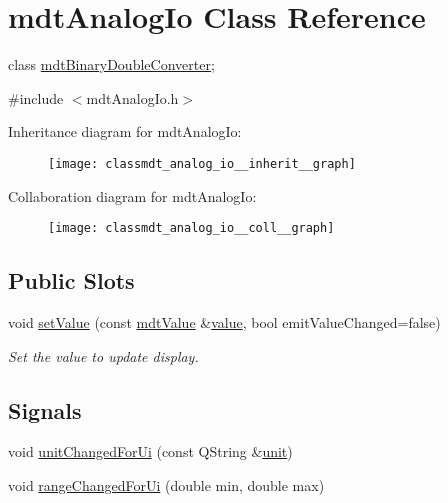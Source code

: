 \hypertarget{classmdt_analog_io}{\section{mdt\-Analog\-Io Class Reference}
\label{classmdt_analog_io}
}


class \hyperlink{classmdt_binary_double_converter}{mdt\-Binary\-Double\-Converter};  




{\ttfamily \#include $<$mdt\-Analog\-Io.\-h$>$}



Inheritance diagram for mdt\-Analog\-Io\-:\nopagebreak
\begin{figure}[H]
\begin{center}
\leavevmode
\texttt{[image: classmdt\_analog\_io\_\_inherit\_\_graph]}
\end{center}
\end{figure}


Collaboration diagram for mdt\-Analog\-Io\-:\nopagebreak
\begin{figure}[H]
\begin{center}
\leavevmode
\texttt{[image: classmdt\_analog\_io\_\_coll\_\_graph]}
\end{center}
\end{figure}
\subsection*{Public Slots}
\begin{DoxyCompactItemize}
\item 
void \hyperlink{classmdt_analog_io_aa2c2fb87d67aad7bbba1b488cc8c1df2}{set\-Value} (const \hyperlink{classmdt_value}{mdt\-Value} \&\hyperlink{classmdt_abstract_io_a839b0d3a4a1d4616e5b20d744c5f75a1}{value}, bool emit\-Value\-Changed=false)
\begin{DoxyCompactList}\small\item\em Set the value to update display. \end{DoxyCompactList}\end{DoxyCompactItemize}
\subsection*{Signals}
\begin{DoxyCompactItemize}
\item 
void \hyperlink{classmdt_analog_io_aa81b49605f601850ecfa780f2b758e98}{unit\-Changed\-For\-Ui} (const Q\-String \&\hyperlink{classmdt_analog_io_a126d5b9bf4a0bb9ce9f2ff6a010fef0e}{unit})
\item 
void \hyperlink{classmdt_analog_io_a40735cbbf852790067a6f9b57aac4aa3}{range\-Changed\-For\-Ui} (double min, double max)
\end{DoxyCompactItemize}
